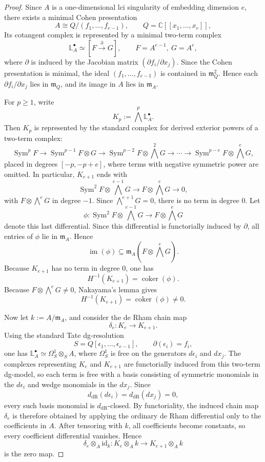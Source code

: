 \documentclass[12pt,reqno]{amsart}
\begin{document}
\begin{proof}
Since \(A\) is a one-dimensional lci singularity of embedding dimension \(e\), there exists a minimal Cohen presentation
\[
A\cong Q/(f_1,\dots,f_{e-1}),
\qquad
Q=\mathbb{C}[[x_1,\dots,x_e]],
\]
Its cotangent complex is represented by a minimal two-term complex
\[
\mathbb{L}^{\bullet}_A\simeq [F\xrightarrow{\partial} G],
\qquad
F=A^{e-1},\ G=A^e,
\]
where \(\partial\) is induced by the Jacobian matrix \(\left(\partial f_i/\partial x_j\right)\).
Since the Cohen presentation is minimal, the ideal \((f_1,\dots,f_{e-1})\) is contained in \(\mathfrak m_Q^2\). Hence each \(\partial f_i/\partial x_j\) lies in \(\mathfrak m_Q\), and its image in \(A\) lies in \(\mathfrak m_A\).

For \(p\ge 1\), write
\[
K_p:=\bigwedge^p\mathbb{L}^{\bullet}_A.
\]
Then \(K_p\) is represented by the standard complex for derived exterior powers of a two-term complex:
\[
\operatorname{Sym}^pF
\longrightarrow
\operatorname{Sym}^{p-1}F\otimes G
\longrightarrow
\operatorname{Sym}^{p-2}F\otimes \bigwedge^2 G
\longrightarrow \cdots \longrightarrow
\operatorname{Sym}^{p-e}F\otimes \bigwedge^e G,
\]
placed in degrees \([-p,-p+e]\), where terms with negative symmetric power are omitted. In particular, \(K_{e+1}\) ends with
\[
\operatorname{Sym}^2F\otimes \bigwedge^{e-1}G
\longrightarrow
F\otimes \bigwedge^e G
\longrightarrow 0,
\]
with \(F\otimes \bigwedge^e G\) in degree \(-1\). Since \(\bigwedge^{e+1}G=0\), there is no term in degree \(0\). Let
\[
\phi:\operatorname{Sym}^2F\otimes \bigwedge^{e-1}G\longrightarrow F\otimes \bigwedge^e G
\]
denote this last differential. Since this differential is functorially induced by \(\partial\), all entries of \(\phi\) lie in \(\mathfrak m_A\). Hence
\[
\operatorname{im}(\phi)\subseteq \mathfrak m_A\!\left(F\otimes \bigwedge^e G\right).
\]
Because \(K_{e+1}\) has no term in degree \(0\), one has
\[
H^{-1}(K_{e+1})=\operatorname{coker}(\phi).
\]
Because \(F\otimes \bigwedge^e G\neq 0\), Nakayama's lemma gives
\[
H^{-1}(K_{e+1})
=
\operatorname{coker}(\phi)\neq 0.
\]

Now let \(k:=A/\mathfrak m_A\), and consider the de Rham chain map
\[
\delta_e:K_e\longrightarrow K_{e+1}.
\]
Using the standard Tate dg-resolution
\[
S=Q[\epsilon_1,\dots,\epsilon_{e-1}],
\qquad
\partial(\epsilon_i)=f_i,
\]
one has \(\mathbb{L}^{\bullet}_A\simeq \Omega^1_{S}\otimes_S A\), where \(\Omega^1_{S}\) is free on the generators \(d\epsilon_i\) and \(dx_j\). The complexes representing \(K_e\) and \(K_{e+1}\) are functorially induced from this two-term dg-model, so each term is free with a basis consisting of symmetric monomials in the \(d\epsilon_i\) and wedge monomials in the \(dx_j\). Since
\[
d_{\mathrm{dR}}(d\epsilon_i)=d_{\mathrm{dR}}(dx_j)=0,
\]
every such basis monomial is \(d_{\mathrm{dR}}\)-closed. By functoriality, the induced chain map \(\delta_e\) is therefore obtained by applying the ordinary de Rham differential only to the coefficients in \(A\). After tensoring with \(k\), all coefficients become constants, so every coefficient differential vanishes. Hence
\[
\delta_e\otimes_A \mathrm{id}_k:
K_e\otimes_A k\longrightarrow K_{e+1}\otimes_A k
\]
is the zero map.


\end{proof}
\end{document}
